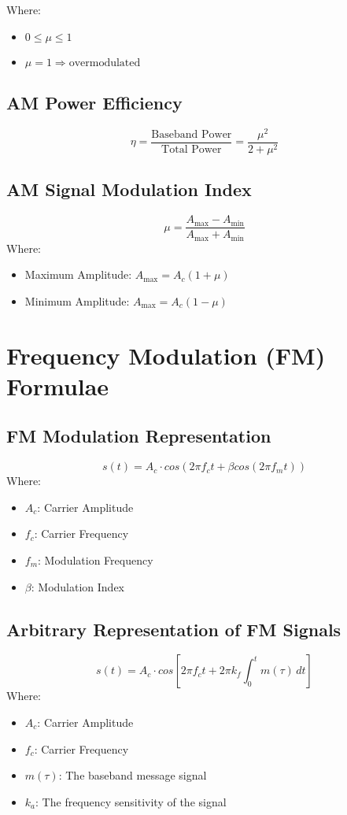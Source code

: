 \documentclass[10pt]{article}
\begin{document}
\noindent Where:
\begin{itemize}
	\item $0 \leq \mu \leq 1$
	\item $\mu = 1 \Rightarrow \text{overmodulated}$
\end{itemize}

\subsection{AM Power Efficiency}
\[
	\eta = \frac{\text{Baseband Power}}{\text{Total Power}} = \frac{\mu^2}{2 + \mu^2}
\]

\subsection{AM Signal Modulation Index}
\[
	\mu = \frac{A_{\text{max}} - A_{\text{min}}}{A_{\text{max}} + A_{\text{min}}}
\]
\noindent Where:
\begin{itemize}
	\item Maximum Amplitude: $A_{\text{max}} = A_c(1+\mu)$
	\item Minimum Amplitude: $A_{\text{max}} = A_c(1-\mu)$
\end{itemize}

\section{Frequency Modulation (FM) Formulae}

\subsection{FM Modulation Representation}
\[
    s(t) = A_c \cdot cos(2 \pi f_c t + \beta cos(2 \pi f_m t))
\]
\noindent Where:
\begin{itemize}
	\item $A_c$: Carrier Amplitude
	\item $f_c$: Carrier Frequency
	\item $f_m$: Modulation Frequency
	\item $\beta$: Modulation Index
\end{itemize}

\subsection{Arbitrary Representation of FM Signals}
\[
    s(t) = A_c \cdot cos\left[2 \pi f_c t + 2\pi k_f \int_{0}^{t} m(\tau) \, dt\right]
\]
\noindent Where:
\begin{itemize}
	\item $A_c$: Carrier Amplitude
	\item $f_c$: Carrier Frequency
    \item $m(\tau)$: The baseband message signal
	\item $k_a$: The frequency sensitivity of the signal
\end{itemize}
\end{document}
